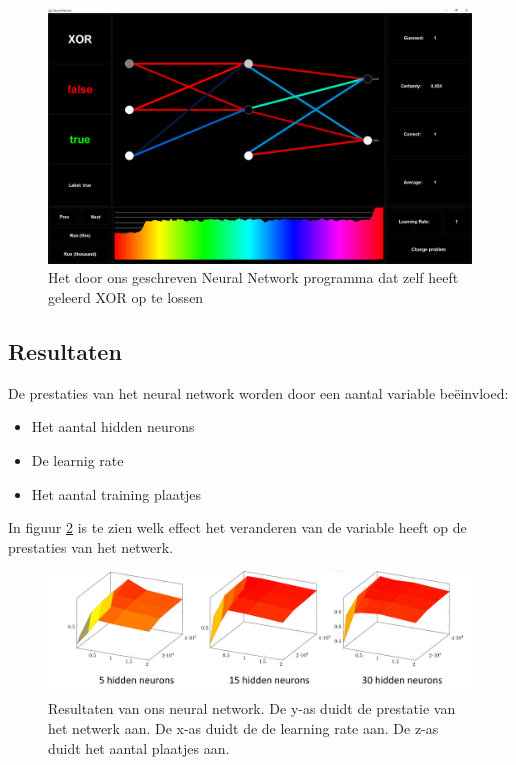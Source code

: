 \documentclass[a4paper,titlepage]{article}
\begin{document}
\begin{figure}[H]
  \centering
    \includegraphics[width=\textwidth]{NeuralNetworkXOR.png}
  \caption{Het door ons geschreven Neural Network programma dat zelf heeft geleerd XOR op te lossen}
  \label{fig:NNXOR}
\end{figure}

\subsection{Resultaten}
De prestaties van het neural network worden door een aantal variable be\"einvloed:

\begin{itemize}
  \item Het aantal hidden neurons
  \item De learnig rate
  \item Het aantal training plaatjes
\end{itemize}

In figuur \ref{fig:NNXOR} is te zien welk effect het veranderen van de variable heeft op de prestaties van het netwerk.

\begin{figure}[H]
  \centering
    \includegraphics[width=\textwidth]{NeuralNetworkDigitRecognitionResults.png}
  \caption{Resultaten van ons neural network.
  De y-as duidt de prestatie van het netwerk aan.
  De x-as duidt de de learning rate aan.
  De z-as duidt het aantal plaatjes aan.}
  \label{fig:NNXOR}
\end{figure}
\end{document}
